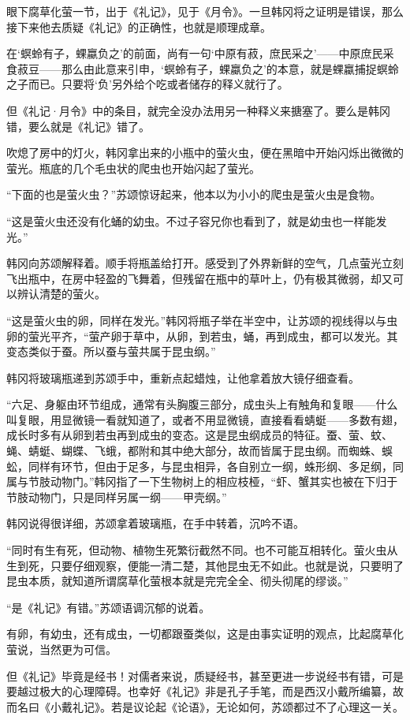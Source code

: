 眼下腐草化萤一节，出于《礼记》，见于《月令》。一旦韩冈将之证明是错误，那么接下来他去质疑《礼记》的正确性，也就是顺理成章。

在‘螟蛉有子，蜾蠃负之’的前面，尚有一句‘中原有菽，庶民采之’——中原庶民采食菽豆——那么由此意来引申，‘螟蛉有子，蜾蠃负之’的本意，就是蜾蠃捕捉螟蛉之子而已。只要将‘负’另外给个吃或者储存的释义就行了。

但《礼记·月令》中的条目，就完全没办法用另一种释义来搪塞了。要么是韩冈错，要么就是《礼记》错了。

吹熄了房中的灯火，韩冈拿出来的小瓶中的萤火虫，便在黑暗中开始闪烁出微微的萤光。瓶底的几个毛虫状的爬虫也开始闪起了萤光。

“下面的也是萤火虫？”苏颂惊讶起来，他本以为小小的爬虫是萤火虫是食物。

“这是萤火虫还没有化蛹的幼虫。不过子容兄你也看到了，就是幼虫也一样能发光。”

韩冈向苏颂解释着。顺手将瓶盖给打开。感受到了外界新鲜的空气，几点萤光立刻飞出瓶中，在房中轻盈的飞舞着，但残留在瓶中的草叶上，仍有极其微弱，却又可以辨认清楚的萤火。

“这是萤火虫的卵，同样在发光。”韩冈将瓶子举在半空中，让苏颂的视线得以与虫卵的萤光平齐，“萤产卵于草中，从卵，到若虫，蛹，再到成虫，都可以发光。其变态类似于蚕。所以蚕与萤共属于昆虫纲。”

韩冈将玻璃瓶递到苏颂手中，重新点起蜡烛，让他拿着放大镜仔细查看。

“六足、身躯由环节组成，通常有头胸腹三部分，成虫头上有触角和复眼——什么叫复眼，用显微镜一看就知道了，或者不用显微镜，直接看看蜻蜓——多数有翅，成长时多有从卵到若虫再到成虫的变态。这是昆虫纲成员的特征。蚕、萤、蚊、蝇、蜻蜓、蝴蝶、飞蛾，都附和其中绝大部分，故而皆属于昆虫纲。而蜘蛛、蜈蚣，同样有环节，但由于足多，与昆虫相异，各自别立一纲，蛛形纲、多足纲，同属与节肢动物门。”韩冈指了一下生物树上的相应枝桠，“虾、蟹其实也被在下归于节肢动物门，只是同样另属一纲——甲壳纲。”

韩冈说得很详细，苏颂拿着玻璃瓶，在手中转着，沉吟不语。

“同时有生有死，但动物、植物生死繁衍截然不同。也不可能互相转化。萤火虫从生到死，只要仔细观察，便能一清二楚，其他昆虫无不如此。也就是说，只要明了昆虫本质，就知道所谓腐草化萤根本就是完完全全、彻头彻尾的缪谈。”

“是《礼记》有错。”苏颂语调沉郁的说着。

有卵，有幼虫，还有成虫，一切都跟蚕类似，这是由事实证明的观点，比起腐草化萤说，当然更为可信。

但《礼记》毕竟是经书！对儒者来说，质疑经书，甚至更进一步说经书有错，可是要越过极大的心理障碍。也幸好《礼记》非是孔子手笔，而是西汉小戴所编纂，故而名曰《小戴礼记》。若是议论起《论语》，无论如何，苏颂都过不了心理这一关。

